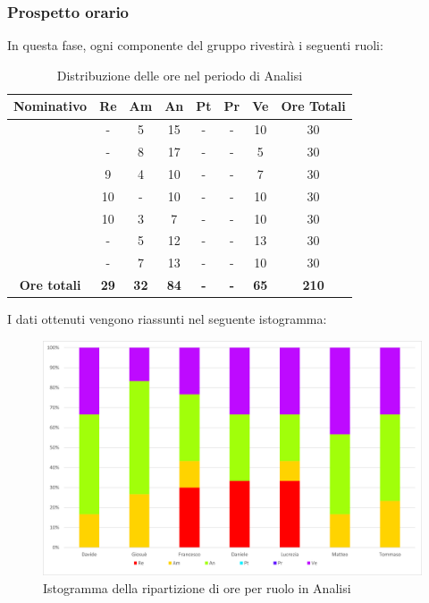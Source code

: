 \subsubsection{Prospetto orario}
In questa fase, ogni componente del gruppo rivestirà i seguenti ruoli:
\begin{table}[H]
		\begin{center}
			\setlength{\aboverulesep}{0pt}
			\setlength{\belowrulesep}{0pt}
			\setlength{\extrarowheight}{.75ex}
			\begin{tabular}{ c c c c c c c c }
				\rowcolor{AzzurroGruppo!30} 
				\textbf{Nominativo} & \textbf{Re} & \textbf{Am} & \textbf{An} & \textbf{Pt} & \textbf{Pr} & \textbf{Ve} & \textbf{Ore Totali}  \\
				\toprule
				\Davide    & -  & 5  & 15 & - & - & 10 & 30 \\
				\Giosue    & -  & 8  & 17 & - & - & 5  & 30 \\
				\Francesco & 9  & 4  & 10 & - & - & 7  & 30\\
				\Daniele   & 10 & -  & 10 & - & - & 10 & 30\\
				\Lucrezia  & 10  & 3 & 7 & - & - & 10 & 30\\
				\Matteo    & -  & 5  & 12 & - & - & 13 & 30\\
				\Tommaso   & -  & 7  & 13 & - & - & 10  & 30\\
				 \textbf{Ore totali} & \textbf{29} & \textbf{32} & \textbf{84} & \textbf{-} & \textbf{-} & \textbf{65} & \textbf{210} \\
				\bottomrule
			\end{tabular}
			\caption{Distribuzione delle ore nel periodo di Analisi}
		\end{center}
	\end{table}
I dati ottenuti vengono riassunti nel seguente istogramma:
\begin{figure}[H]
    \centering
    \includegraphics[scale = 0.5]{components/img/Analisi-isto.png}
    \caption{ Istogramma della ripartizione di ore per ruolo in Analisi}
    \label{fig:istogramma ripartizione ore , fase di Analisi}
\end{figure}
